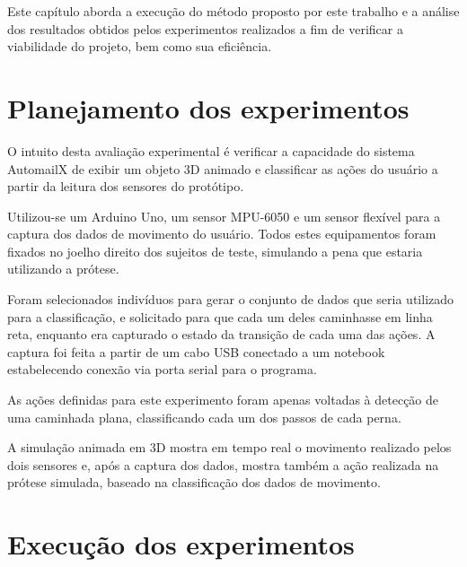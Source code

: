 Este capítulo aborda a execução do método proposto por este trabalho e a análise dos resultados obtidos pelos experimentos realizados a fim de verificar a viabilidade do projeto, bem como sua eficiência.

\section{Planejamento dos experimentos}\label{sec:result_planejamento}
O intuito desta avaliação experimental é verificar a capacidade do sistema AutomailX de exibir um objeto 3D animado e classificar as ações do usuário a partir da leitura dos sensores do protótipo.

 Utilizou-se um Arduino Uno, um sensor MPU-6050 e um sensor flexível para a captura dos dados de movimento do usuário. Todos estes equipamentos foram fixados  no joelho direito dos sujeitos de teste, simulando a pena que estaria utilizando a prótese.

Foram selecionados indivíduos para gerar o conjunto de dados que seria utilizado para a classificação, e solicitado para que cada um deles caminhasse em linha reta, enquanto era capturado o estado da transição de cada uma das ações. A captura foi feita a partir de um cabo USB conectado a um notebook  estabelecendo conexão via porta serial para o programa.

As ações definidas para este experimento foram apenas voltadas à detecção de uma caminhada plana, classificando cada um dos passos de cada perna.

A simulação animada em 3D mostra em tempo real o movimento realizado pelos dois sensores e, após a captura dos dados, mostra também a ação realizada na prótese simulada, baseado na classificação dos dados de movimento.

\section{Execução dos experimentos}\label{sec:result_execucao}

